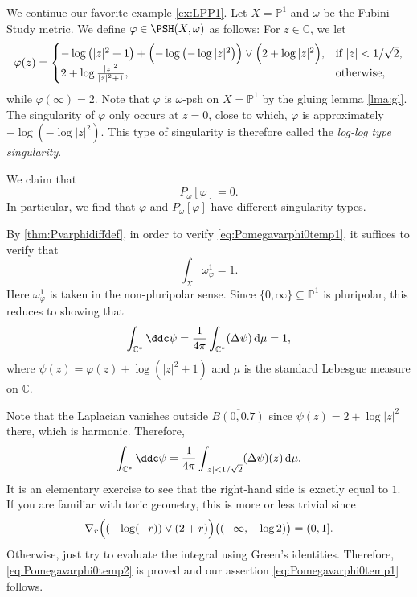 \begin{example}\label{ex:loglogsing}
    We continue our favorite example \cref{ex:LPP1}. Let $X=\mathbb{P}^1$ and $\omega$ be the Fubini--Study metric. We define $\varphi\in \PSH(X,\omega)$ as follows: For $z\in \mathbb{C}$, we let
    \[
    \varphi(z)=
    \begin{cases}
        -\log \left(|z|^2+1\right)+\Bigl(-\log \left(-\log |z|^2\right)\Bigr) \lor \Bigl(2+\log |z|^2\Bigr),& \textup{if }|z|<1/\sqrt{2},\\
        2+\log \frac{|z|^2}{|z|^2+1},& \textup{otherwise},
    \end{cases}
    \]
    while $\varphi(\infty)=2$. Note that $\varphi$ is $\omega$-psh on $X=\mathbb{P}^1$ by the gluing lemma \cref{lma:gl}.
The singularity of $\varphi$ only occurs at $z=0$, close to which, $\varphi$ is approximately $-\log \left(-\log |z|^2\right)$. This type of singularity is therefore called the \emph{log-log type singularity}.

    We claim that
    \begin{equation}\label{eq:Pomegavarphi0temp1}
        P_{\omega}[\varphi]=0.
    \end{equation}
    In particular, we find that $\varphi$ and $P_{\omega}[\varphi]$ have different singularity types.

    By \cref{thm:Pvarphidiffdef}, in order to verify \eqref{eq:Pomegavarphi0temp1}, it suffices to verify that
    \begin{equation}\label{eq:Pomegavarphi0temp2}
    \int_X \omega_{\varphi}^1=1.
    \end{equation}
    Here $\omega_{\varphi}^1$ is taken in the non-pluripolar sense. Since $\{0,\infty\}\subseteq \mathbb{P}^1$ is pluripolar, this reduces to showing that
    \[
    \int_{\mathbb{C}^*} \ddc \psi=\frac{1}{4\pi}\int_{\mathbb{C}^*} (\Delta \psi)\,\mathrm{d}\mu=1,
    \]
    where $\psi(z)=\varphi(z)+\log (|z|^2+1)$ and $\mu$ is the standard Lebesgue measure on $\mathbb{C}$.

    Note that the Laplacian vanishes outside $\overline{B(0,0.7)}$ since $\psi(z)=2+\log |z|^2$ there, which is harmonic. Therefore,
    \[
    \int_{\mathbb{C}^*} \ddc \psi=\frac{1}{4\pi}\int_{|z|<1/\sqrt{2}} (\Delta \psi)(z)\,\mathrm{d}\mu.
    \]
    It is an elementary exercise to see that the right-hand side is exactly equal to $1$. If you are familiar with toric geometry, this is more or less trivial since
    \[
    \nabla_r \Bigl( \left(-\log (-r)\right)\lor (2+r) \Bigr)\bigl((-\infty,-\log 2)\bigr)= (0,1].
    \]
    Otherwise, just try to evaluate the integral using Green's identities. Therefore, \eqref{eq:Pomegavarphi0temp2} is proved and our assertion \eqref{eq:Pomegavarphi0temp1} follows.
\end{example}


